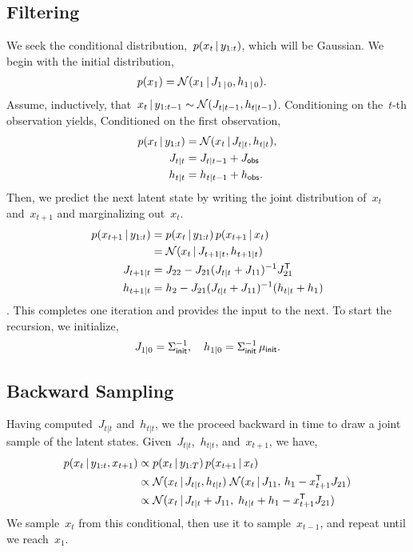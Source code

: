 \documentclass{article}
\begin{document}
\subsection*{Filtering}
We seek the conditional distribution,~$p(x_t \,|\, y_{1:t})$, which 
will be Gaussian. We begin with the initial distribution, 
\begin{align}
  p(x_1) &= \mathcal{N}(x_1 \,|\, J_{1 \,|\, 0}, h_{1 \,|\, 0}).
\end{align}
Assume, inductively, that~$x_t \,|\, y_{1:t-1} \sim \mathcal{N}(J_{t|t-1}, h_{t|t-1})$. Conditioning on the~$t$-th observation yields,
Conditioned on the first observation,
\begin{align}
  p(x_t \,|\, y_{1:t}) &= \mathcal{N}(x_t \,|\, J_{t|t}, h_{t|t}), \\
  J_{t|t} &= J_{t|t-1} + J_{\sf obs} \\
  h_{t|t} &= h_{t|t-1} + h_{\sf obs}.
\end{align}
Then, we predict the next latent state by writing the joint distribution of~$x_t$ and~$x_{t+1}$ and marginalizing out~$x_t$.
\begin{align}
  p(x_{t+1} \,|\, y_{1:t}) &= p(x_t \,|\, y_{1:t}) \, p(x_{t+1} \,|\, x_t) \\
  &= \mathcal{N}(x_t \,|\, J_{t+1|t}, h_{t+1|t}) \\
  J_{t+1|t} &= J_{22} - J_{21} (J_{t|t} + J_{11})^{-1}J_{21}^{\mathsf{T}} \\
  h_{t+1|t} &= h_2 - J_{21} (J_{t|t} + J_{11})^{-1} (h_{t|t} + h_1)
\end{align}.
This completes one iteration and provides the input to the next. To start the recursion, we initialize,
\begin{align}
  J_{1|0} = \Sigma_{\sf init}^{-1}, \quad
  h_{1|0} = \Sigma_{\sf init}^{-1} \, \mu_{\sf init}.
\end{align}

\subsection*{Backward Sampling}
Having computed~$J_{t|t}$ and~$h_{t|t}$, we the proceed backward in time to draw a joint sample of the latent states. 
Given~$J_{t|t}$,~$h_{t|t}$, and~$x_{t+1}$, we have,
\begin{align}
  p(x_{t} \,|\, y_{1:t}, x_{t+1}) &\propto p(x_t \,|\, y_{1:T}) \, p(x_{t+1} \,|\, x_t) \\
  &\propto \mathcal{N}(x_t \,|\, J_{t|t}, h_{t|t})  \;
    \mathcal{N}(x_t \,|\, J_{11}, \, h_1 - x_{t+1}^{\mathsf{T}} J_{21} ) \\
  &\propto     \mathcal{N}(x_t \,|\, J_{t|t} + J_{11}, \; h_{t|t} + h_1 - x_{t+1}^{\mathsf{T}} J_{21} )
\end{align}
We sample~$x_t$ from this conditional, then use it to sample~$x_{t-1}$, and repeat until we reach~$x_1$.
\end{document}
